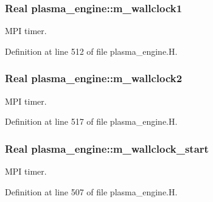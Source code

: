 \subsubsection[{\texorpdfstring{m\+\_\+wallclock1}{m_wallclock1}}]{\setlength{\rightskip}{0pt plus 5cm}Real plasma\+\_\+engine\+::m\+\_\+wallclock1\hspace{0.3cm}{\ttfamily [protected]}}\hypertarget{classplasma__engine_adab190b38ee0eded079742d947bc04b7}{}\label{classplasma__engine_adab190b38ee0eded079742d947bc04b7}


M\+PI timer. 



Definition at line 512 of file plasma\+\_\+engine.\+H.

\subsubsection[{\texorpdfstring{m\+\_\+wallclock2}{m_wallclock2}}]{\setlength{\rightskip}{0pt plus 5cm}Real plasma\+\_\+engine\+::m\+\_\+wallclock2\hspace{0.3cm}{\ttfamily [protected]}}\hypertarget{classplasma__engine_ae1d14f86a6556e643d8295a337b7578f}{}\label{classplasma__engine_ae1d14f86a6556e643d8295a337b7578f}


M\+PI timer. 



Definition at line 517 of file plasma\+\_\+engine.\+H.

\subsubsection[{\texorpdfstring{m\+\_\+wallclock\+\_\+start}{m_wallclock_start}}]{\setlength{\rightskip}{0pt plus 5cm}Real plasma\+\_\+engine\+::m\+\_\+wallclock\+\_\+start\hspace{0.3cm}{\ttfamily [protected]}}\hypertarget{classplasma__engine_a91803bbb045ae9087c61744acde5e6a4}{}\label{classplasma__engine_a91803bbb045ae9087c61744acde5e6a4}


M\+PI timer. 



Definition at line 507 of file plasma\+\_\+engine.\+H.

